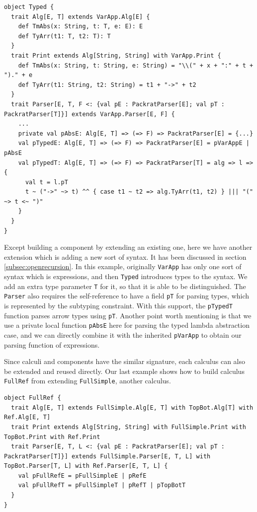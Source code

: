 \begin{lstlisting}
object Typed {
  trait Alg[E, T] extends VarApp.Alg[E] {
    def TmAbs(x: String, t: T, e: E): E
    def TyArr(t1: T, t2: T): T
  }
  trait Print extends Alg[String, String] with VarApp.Print {
    def TmAbs(x: String, t: String, e: String) = "\\(" + x + ":" + t + ")." + e
    def TyArr(t1: String, t2: String) = t1 + "->" + t2
  }
  trait Parser[E, T, F <: {val pE : PackratParser[E]; val pT : PackratParser[T]}] extends VarApp.Parser[E, F] {
    ...
    private val pAbsE: Alg[E, T] => (=> F) => PackratParser[E] = {...}
    val pTypedE: Alg[E, T] => (=> F) => PackratParser[E] = pVarAppE | pAbsE
    val pTypedT: Alg[E, T] => (=> F) => PackratParser[T] = alg => l => {
      val t = l.pT
      t ~ ("->" ~> t) ^^ { case t1 ~ t2 => alg.TyArr(t1, t2) } ||| "(" ~> t <~ ")"
    }
  }
}
\end{lstlisting}

Except building a component by extending an existing one, here we have another extension which is adding a new sort of syntax. It has been discussed in section \ref{subsec:openrecursion}. In this example, originally \lstinline{VarApp} has only one sort of syntax which is expressions, and then \lstinline{Typed} introduces types to the syntax. We add an extra type parameter \lstinline{T} for it, so that it is able to be distinguished. The \lstinline{Parser} also requires the self-reference to have a field \lstinline{pT} for parsing types, which is represented by the subtyping constraint. With this support, the \lstinline{pTypedT} function parses arrow types using \lstinline{pT}. Another point worth mentioning is that we use a private local function \lstinline{pAbsE} here for parsing the typed lambda abstraction case, and we can directly combine it with the inherited \lstinline{pVarApp} to obtain our parsing function of expressions.

Since calculi and components have the similar signature, each calculus can also be extended and reused directly. Our last example shows how to build calculus \lstinline{FullRef} from extending \lstinline{FullSimple}, another calculus.

\begin{lstlisting}
object FullRef {
  trait Alg[E, T] extends FullSimple.Alg[E, T] with TopBot.Alg[T] with Ref.Alg[E, T]
  trait Print extends Alg[String, String] with FullSimple.Print with TopBot.Print with Ref.Print
  trait Parser[E, T, L <: {val pE : PackratParser[E]; val pT : PackratParser[T]}] extends FullSimple.Parser[E, T, L] with TopBot.Parser[T, L] with Ref.Parser[E, T, L] {
    val pFullRefE = pFullSimpleE | pRefE
    val pFullRefT = pFullSimpleT | pRefT | pTopBotT
  }
}
\end{lstlisting}

